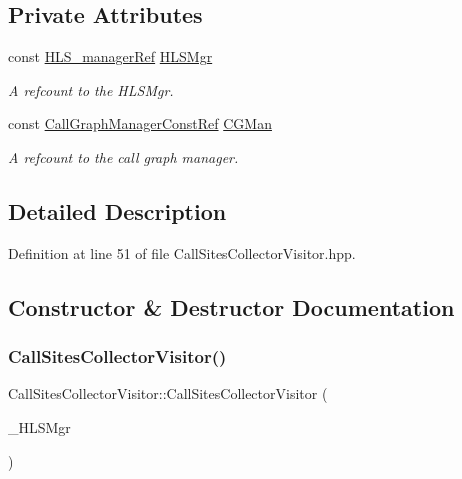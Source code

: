 \subsection*{Private Attributes}
\begin{DoxyCompactItemize}
\item 
const \hyperlink{hls__manager_8hpp_acd3842b8589fe52c08fc0b2fcc813bfe}{H\+L\+S\+\_\+manager\+Ref} \hyperlink{classCallSitesCollectorVisitor_ac3a3780f5fefee14cb8e46c34a8a8f12}{H\+L\+S\+Mgr}
\begin{DoxyCompactList}\small\item\em A refcount to the H\+L\+S\+Mgr. \end{DoxyCompactList}\item 
const \hyperlink{call__graph__manager_8hpp_a19eec454bbf914c67fe80bcf28e4a90f}{Call\+Graph\+Manager\+Const\+Ref} \hyperlink{classCallSitesCollectorVisitor_ac787c83ad36341c3d7563758e613dd23}{C\+G\+Man}
\begin{DoxyCompactList}\small\item\em A refcount to the call graph manager. \end{DoxyCompactList}\end{DoxyCompactItemize}


\subsection{Detailed Description}


Definition at line 51 of file Call\+Sites\+Collector\+Visitor.\+hpp.



\subsection{Constructor \& Destructor Documentation}
\mbox{\label{classCallSitesCollectorVisitor_af0464f236c4fb81f79fe157d31e30116}} 
\subsubsection{\texorpdfstring{Call\+Sites\+Collector\+Visitor()}{CallSitesCollectorVisitor()}}
{\footnotesize\ttfamily Call\+Sites\+Collector\+Visitor\+::\+Call\+Sites\+Collector\+Visitor (\begin{DoxyParamCaption}\item[{const \hyperlink{hls__manager_8hpp_acd3842b8589fe52c08fc0b2fcc813bfe}{H\+L\+S\+\_\+manager\+Ref} \&}]{\+\_\+\+H\+L\+S\+Mgr }\end{DoxyParamCaption})}



